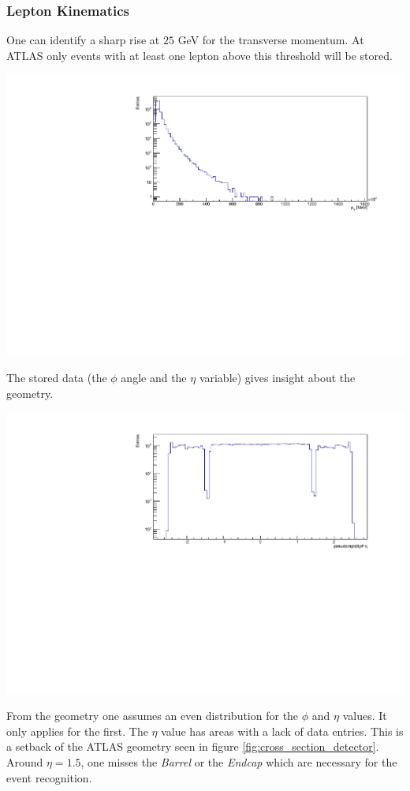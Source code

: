 \documentclass[12pt, a4paper, bibliography=totoc]{scrartcl}
\begin{document}
\begin{multicols}{2}
\subsubsection{Lepton Kinematics}
One can identify a sharp rise at $25$ \si{GeV} for the transverse momentum. 
At ATLAS only events with at least one lepton above this threshold will be stored.
\begin{center}
    \includegraphics[width=0.8\linewidth]{fig/p_T_final.pdf}
\end{center}    
The stored data (the $\phi$ angle and the $\eta$ variable) gives insight about the geometry.
\begin{center}
    \includegraphics[width=0.8\linewidth]{fig/eta_final.pdf}
\end{center}
From the geometry one assumes an even distribution for the $\phi$ and $\eta$ values.
It only applies for the first. 
The $\eta$ value has areas with a lack of data entries. 
This is a setback of the ATLAS geometry seen in figure \ref{fig:cross_section_detector}. 
Around $\eta = 1.5$, one misses the \textit{Barrel} or the \textit{Endcap} which are necessary for the event recognition. 


\end{multicols}
\end{document}
